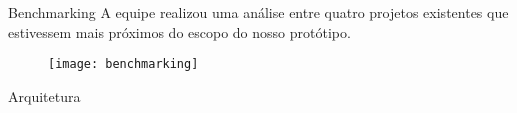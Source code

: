 \begin{frame}[t]{Benchmarking}
    \vspace{0.5cm}
 A equipe realizou uma análise entre quatro projetos existentes que estivessem mais próximos do escopo do nosso protótipo.
    \begin{figure}
        \texttt{[image: benchmarking]}
    \end{figure}
    \vspace{1cm}

\end{frame}
\begin{frame}[t]{Arquitetura}
    
\end{frame}
